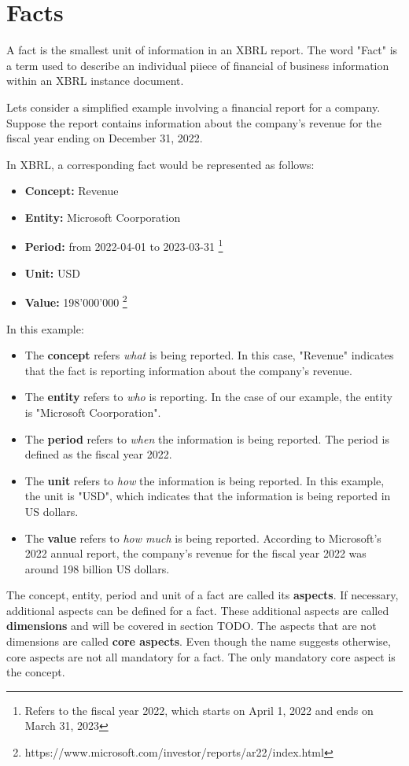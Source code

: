 \section{Facts}

A fact is the smallest unit of information in an XBRL report. 
The word "Fact" is a term used to describe an individual piiece of financial of business information within an XBRL instance document. 

Lets consider a simplified example involving a financial report for a company. 
Suppose the report contains information about the company's revenue for the fiscal year ending on December 31, 2022.

In XBRL, a corresponding fact would be represented as follows:

\begin{itemize}
    \item \textbf{Concept:} Revenue
    \item \textbf{Entity:} Microsoft Coorporation
    \item \textbf{Period:} from 2022-04-01 to 2023-03-31 \footnote[0]{Refers to the fiscal year 2022, which starts on April 1, 2022 and ends on March 31, 2023}
    \item \textbf{Unit:} USD
    \item \textbf{Value:} 198'000'000 \footnote[1]{https://www.microsoft.com/investor/reports/ar22/index.html}
\end{itemize}

In this example:

\begin{itemize}
    \item The \textbf{concept} refers \textit{what} is being reported. 
    In this case, "Revenue" indicates that the fact is reporting information about the company's revenue.
    \item The \textbf{entity} refers to \textit{who} is reporting. 
    In the case of our example, the entity is "Microsoft Coorporation".
    \item The \textbf{period} refers to \textit{when} the information is being reported.
    The period is defined as the fiscal year 2022.
    \item The \textbf{unit} refers to \textit{how} the information is being reported.
    In this example, the unit is "USD", which indicates that the information is being reported in US dollars.
    \item The \textbf{value} refers to \textit{how much} is being reported.
    According to Microsoft's 2022 annual report, the company's revenue for the fiscal year 2022 was around 198 billion US dollars.
\end{itemize}

The concept, entity, period and unit of a fact are called its \textbf{aspects}. 
If necessary, additional aspects can be defined for a fact. 
These additional aspects are called \textbf{dimensions} and will be covered in section TODO.
The aspects that are not dimensions are called \textbf{core aspects}. 
Even though the name suggests otherwise, core aspects are not all mandatory for a fact.
The only mandatory core aspect is the concept.